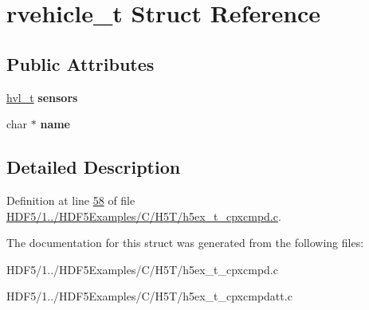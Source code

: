 \hypertarget{structrvehicle__t}{}\section{rvehicle\+\_\+t Struct Reference}
\label{structrvehicle__t}
\subsection*{Public Attributes}
\begin{DoxyCompactItemize}
\item 
\mbox{\label{structrvehicle__t_af50a9e1f25b9968b19f3fc27b58c039f}} 
\hyperlink{structhvl__t}{hvl\+\_\+t} {\bfseries sensors}
\item 
\mbox{\label{structrvehicle__t_a51c7146fbe5db308b555091da84ff354}} 
char $\ast$ {\bfseries name}
\end{DoxyCompactItemize}


\subsection{Detailed Description}


Definition at line \hyperlink{_h_d_f5_21_810_81_2_h_d_f5_examples_2_c_2_h5_t_2h5ex__t__cpxcmpd_8c_source_l00058}{58} of file \hyperlink{_h_d_f5_21_810_81_2_h_d_f5_examples_2_c_2_h5_t_2h5ex__t__cpxcmpd_8c_source}{H\+D\+F5/1../\+H\+D\+F5\+Examples/\+C/\+H5\+T/h5ex\+\_\+t\+\_\+cpxcmpd.\+c}.



The documentation for this struct was generated from the following files\+:\begin{DoxyCompactItemize}
\item 
H\+D\+F5/1../\+H\+D\+F5\+Examples/\+C/\+H5\+T/h5ex\+\_\+t\+\_\+cpxcmpd.\+c\item 
H\+D\+F5/1../\+H\+D\+F5\+Examples/\+C/\+H5\+T/h5ex\+\_\+t\+\_\+cpxcmpdatt.\+c\end{DoxyCompactItemize}
